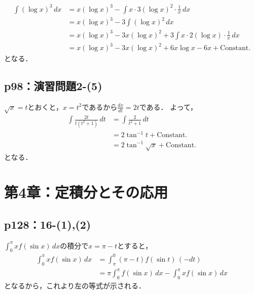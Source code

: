 \documentclass[uplatex,dvipdfmx,a4paper,10pt,fleqn]{jsarticle}
\begin{document}
\begin{tleftbar}
\begin{align*} 
    \int (\log x)^3 \, dx & = x (\log x)^3 - \int x \cdot 3 (\log x)^2 \cdot \frac{1}{x} \, dx \\
    & = x(\log x)^3- 3  \int (\log x)^2 \, dx \\
    & = x(\log x)^3 - 3x (\log x)^2 + 3\int x \cdot 2 (\log x )\cdot \frac{1}{x} \, dx \\
    & = x (\log x)^3 - 3x (\log x)^2 + 6 x\log x - 6x+\mathrm{Constant.}
\end{align*} 
となる．
\end{tleftbar}


\subsection*{p98：演習問題2-(5)}

\begin{tleftbar}
    $\sqrt{x}=t$とおくと，$ x =t^2$であるから$ \frac{dx}{dt}=2t$である．
    よって，
    \begin{align*}
        \int \frac{2t}{t (t^2+1)} \, dt & = \int \frac{2}{t^2+1}\, dt \\
        & = 2 \tan^{-1} t + \mathrm{Constant.}\\
        & = 2 \tan^{-1} \sqrt{x} + \mathrm{Constant.}
    \end{align*} 
    となる．
\end{tleftbar}



\section*{第4章：定積分とその応用}


\subsection*{p128：16-(1),(2)}

$\int_{0}^{\pi} x f(\sin x)\, dx $の積分で$x= \pi -t $とすると，
\begin{align*} 
    \int_{0}^{\pi} x f( \sin x) \, dx & = \int_{\pi}^{0} (\pi - t) f(\sin t )\, ( -dt) \\
    & = \pi \int_{0}^{\pi} f(\sin x) \, dx - \int_{0}^{\pi} x f (\sin x)\, dx 
\end{align*} 
となるから，これより左の等式が示される．
\end{document}
